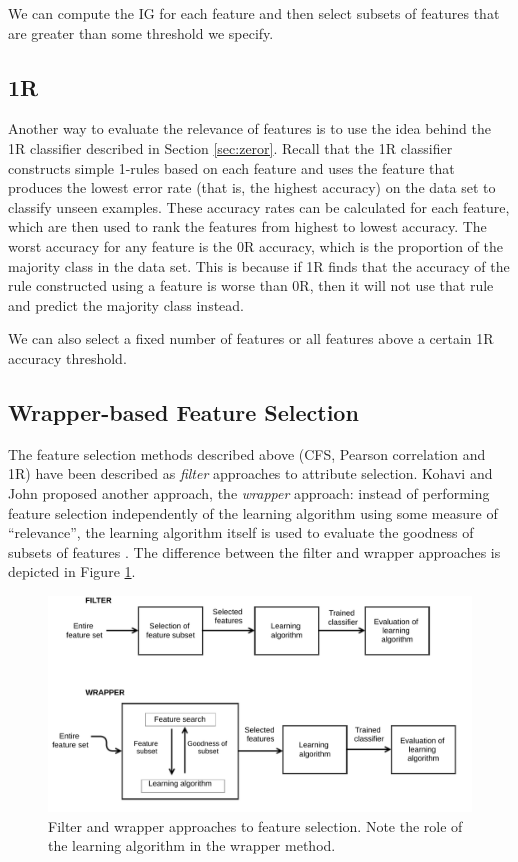 We can compute the IG for each feature and then select subsets of features that
are greater than some threshold we specify.

\subsection{1R}
Another way to evaluate the relevance of features is to use the idea behind the
1R classifier described in Section \ref{sec:zeror}. Recall that the 1R
classifier constructs simple 1-rules based on each feature and uses the feature
that produces the lowest error rate (that is, the highest accuracy) on the data
set to classify unseen examples. These accuracy rates can be calculated for
each feature, which are then used to rank the features from highest to lowest
accuracy. The worst accuracy for any feature is the 0R accuracy, which is the
proportion of the majority class in the data set. This is because if 1R finds
that the accuracy of the rule constructed using a feature is worse than 0R,
then it will not use that rule and predict the majority class instead.

We can also select a fixed number of features or all features above a certain
1R accuracy threshold.

\subsection{Wrapper-based Feature Selection}
The feature selection methods described above (CFS, Pearson correlation and
1R) have been described as \textit{filter} approaches to attribute selection.
Kohavi and John proposed another approach, the \textit{wrapper} approach:
instead of performing feature selection independently of the learning
algorithm using some measure of ``relevance'',
the learning algorithm itself is used to evaluate the goodness of
subsets of features \cite{Kohavi1997}. The difference between the filter
and wrapper approaches is depicted in Figure \ref{fig:wrapper}.

\begin{figure}[h]
\centering
\includegraphics[scale=0.9]{images/method/feature-selection.pdf}
\caption{Filter and wrapper approaches to feature selection. Note the role of
the learning algorithm in the wrapper method.}
\label{fig:wrapper}
\end{figure}

